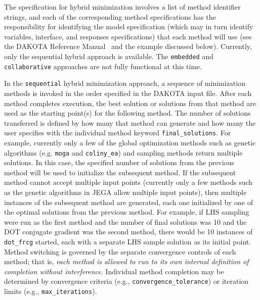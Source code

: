 The specification for hybrid minimization involves a list of
method identifier strings, and each of the corresponding method
specifications has the responsibility for identifying the model
specification (which may in turn identify variables, interface, and
responses specifications) that each method will use (see the DAKOTA
Reference Manual~\cite{RefMan} and the example discussed below).
Currently, only the sequential hybrid approach is available. The
\texttt{embedded} and \texttt{collaborative} approaches are
not fully functional at this time.

In the \texttt{sequential} hybrid minimization approach, a sequence
of minimization methods is invoked in the order specified in the
DAKOTA input file. After each method completes execution, 
the best solution or solutions from that method are used as the
starting point(s) for the following method. 
The number of solutions transferred 
is defined by how many that method can generate and how many the 
user specifies with the individual method keyword \texttt{final\_solutions}. 
For example, currently only a few of the global optimization methods such as 
genetic algorithms (e.g. \texttt{moga} and \texttt{coliny\_ea}) and 
sampling methods return multiple solutions.  In this case, 
the specified number of solutions from the previous 
method will be used to initialize the subsequent method.  If the subsequent 
method cannot accept multiple input points (currently only a few methods 
such as the genetic algorithms in JEGA allow multiple input points), then 
multiple instances of the subsequent method are generated, each one 
initialized by one of the optimal solutions from the previous method. 
For example, if LHS sampling were run as the first method and 
the number of final solutions was 10 and the DOT conjugate gradient 
was the second method, there would be 10 instances of \texttt{dot\_frcg} 
started, each with a separate LHS sample solution as its initial point. 
Method switching is governed
by the separate convergence controls of each method; that is,
\emph{each method is allowed to run to its own internal definition of
completion without interference}. Individual method completion may be
determined by convergence criteria (e.g.,
\texttt{convergence\_tolerance}) or iteration limits (e.g.,
\texttt{max\_iterations}).  


